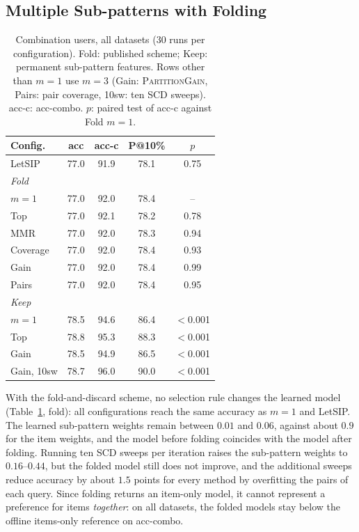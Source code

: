 \subsection{Multiple Sub-patterns with Folding}
\label{subsec:main_results}

\begin{table}[t]
\centering
\caption{Combination users, all datasets (30 runs per configuration). Fold: published scheme; Keep:
permanent sub-pattern features. Rows other than $m{=}1$ use $m = 3$ (Gain:
\textsc{PartitionGain}, Pairs: pair coverage, 10sw: ten SCD sweeps). acc-c: acc-combo. $p$: paired test of
acc-c against Fold $m{=}1$.}
\label{tab:main}
\small
\setlength{\tabcolsep}{4pt}
\begin{tabular}{lcccc}
\toprule
Config. & acc & acc-c & P@10\% & $p$ \\
\midrule
LetSIP              & 77.0 & 91.9 & 78.1 & 0.75 \\
\multicolumn{5}{l}{\emph{Fold}} \\
\quad $m{=}1$       & 77.0 & 92.0 & 78.4 & --   \\
\quad Top           & 77.0 & 92.1 & 78.2 & 0.78 \\
\quad MMR           & 77.0 & 92.0 & 78.3 & 0.94 \\
\quad Coverage      & 77.0 & 92.0 & 78.4 & 0.93 \\
\quad Gain          & 77.0 & 92.0 & 78.4 & 0.99 \\
\quad Pairs         & 77.0 & 92.0 & 78.4 & 0.95 \\
\multicolumn{5}{l}{\emph{Keep}} \\
\quad $m{=}1$       & 78.5 & 94.6 & 86.4 & $<$0.001 \\
\quad Top           & 78.8 & 95.3 & 88.3 & $<$0.001 \\
\quad Gain          & 78.5 & 94.9 & 86.5 & $<$0.001 \\
\quad Gain, 10sw    & 78.7 & 96.0 & 90.0 & $<$0.001 \\
\bottomrule
\end{tabular}
\end{table}

With the fold-and-discard scheme, no selection rule changes the learned model (Table~\ref{tab:main}, fold):
all configurations reach the same accuracy as $m = 1$ and LetSIP. The learned sub-pattern weights
remain between $0.01$ and $0.06$, against about $0.9$ for the item weights, and the model before folding
coincides with the model after folding. Running ten SCD sweeps per iteration raises the sub-pattern
weights to $0.16$--$0.44$, but the folded model still does not improve, and the additional sweeps reduce
accuracy by about $1.5$ points for every method by overfitting the pairs of each query. Since folding
returns an item-only model, it cannot represent a preference for items \emph{together}: on all datasets,
the folded models stay below the offline items-only reference on acc-combo.

